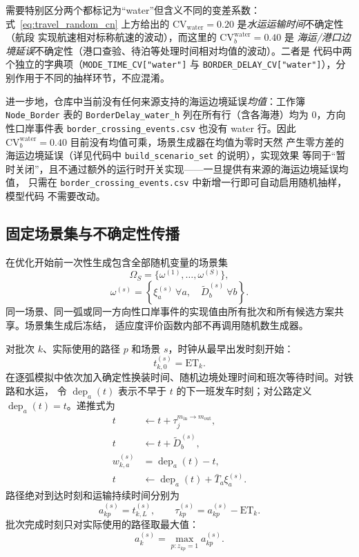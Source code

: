 需要特别区分两个都标记为“water”但含义不同的变差系数：式~\eqref{eq:travel_random_cn}
上方给出的 $\mathrm{CV}_{\mathrm{water}}=0.20$ 是\emph{水运运输时间}不确定性（航段
实现航速相对标称航速的波动），而这里的 $\mathrm{CV}_{b}^{\mathrm{water}}=0.40$ 是
\emph{海运/港口边境延误}不确定性（港口查验、待泊等处理时间相对均值的波动）。二者是
代码中两个独立的字典项（\texttt{MODE\_TIME\_CV["water"]} 与
\texttt{BORDER\_DELAY\_CV["water"]}），分别作用于不同的抽样环节，不应混淆。

进一步地，仓库中当前没有任何来源支持的海运边境延误\emph{均值}：工作簿
\texttt{Node\_Border} 表的 \texttt{BorderDelay\_water\_h} 列在所有行（含各海港）均为
0，方向性口岸事件表 \texttt{border\_crossing\_events.csv} 也没有 water 行。因此
$\mathrm{CV}_{b}^{\mathrm{water}}=0.40$ 目前没有均值可乘，场景生成器在均值为零时天然
产生零方差的海运边境延误（详见代码中 \texttt{build\_scenario\_set} 的说明），实现效果
等同于“暂时关闭”，且不通过额外的运行时开关实现——一旦提供有来源的海运边境延误均值，
只需在 \texttt{border\_crossing\_events.csv} 中新增一行即可自动启用随机抽样，模型代码
不需要改动。

\subsection{固定场景集与不确定性传播}

在优化开始前一次性生成包含全部随机变量的场景集
\begin{equation}\label{eq:frozen_scenarios_cn}
  \Omega_S=\{\omega^{(1)},\ldots,\omega^{(S)}\},
\end{equation}
\begin{equation}
 \omega^{(s)}=
 \left\{\xi_a^{(s)}\ \forall a,\quad
 \tilde D_b^{(s)}\ \forall b\right\}.
\end{equation}
同一场景、同一弧或同一方向性口岸事件的实现值由所有批次和所有候选方案共享。场景集生成后冻结，
适应度评价函数内部不再调用随机数生成器。

对批次 $k$、实际使用的路径 $p$ 和场景 $s$，时钟从最早出发时刻开始：
\begin{equation}
 t_{k,0}^{(s)}=\mathrm{ET}_k.
\end{equation}
在逐弧模拟中依次加入确定性换装时间、随机边境处理时间和班次等待时间。对铁路和水运，
令 $\operatorname{dep}_a(t)$ 表示不早于 $t$ 的下一班发车时刻；对公路定义
$\operatorname{dep}_a(t)=t$。递推式为
\begin{align}
 t &\leftarrow t+\tau_j^{m_{\mathrm{in}}\to m_{\mathrm{out}}},\\
 t &\leftarrow t+\tilde D_b^{(s)},\\
 w_{k,a}^{(s)}&=\operatorname{dep}_a(t)-t,\\
 t &\leftarrow \operatorname{dep}_a(t)+\bar T_a\xi_a^{(s)}.
\end{align}
路径绝对到达时刻和运输持续时间分别为
\begin{equation}
 a_{kp}^{(s)}=t_{k,L}^{(s)},\qquad
 \tau_{kp}^{(s)}=a_{kp}^{(s)}-\mathrm{ET}_k.
\end{equation}
批次完成时刻只对实际使用的路径取最大值：
\begin{equation}
 a_k^{(s)}=\max_{p:z_{kp}=1}a_{kp}^{(s)}.
\end{equation}

